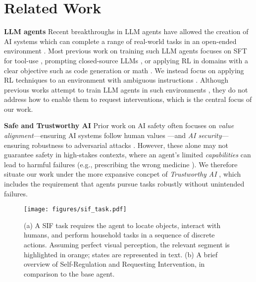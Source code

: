 \section{Related Work}
\textbf{LLM agents }  Recent breakthroughs in LLM agents \citep{yao2023react,yang2024sweagent,shinn2024reflexion}  have allowed the creation of AI systems which can complete a range of real-world tasks in an open-ended environment \citep{nakano2021webgpt, schick2023toolformer, openhands}.
Most previous work on training such LLM agents focuses on SFT for tool-use \citep{schick2023toolformer}, prompting closed-source LLMs \citep{yang2024sweagent,wang2024executable,openhands}, or applying RL in domains with a clear objective such as code generation or math \citep{dubey2024llama,chen2024self}. We instead focus on applying RL techniques to an environment with ambiguous instructions \citep{min2025situated}. Although previous works attempt to train LLM agents in such environments \citep{zhai2024finetuning,gehring2024rlef}, they do not address how to enable them to request interventions, which is the central focus of our work.

\textbf{Safe and Trustworthy AI } Prior work on AI safety often focuses on \emph{value alignment}—ensuring AI systems follow human values \citep{gabriel2020artificial,christiano2017deep,bai2022constitutional}—and \emph{AI security}—ensuring robustness to adversarial attacks \citep{hendrycks2021unsolved,brundage2018malicious}. However, these alone may not guarantee safety in high-stakes contexts, where an agent’s limited \emph{capabilities} can lead to harmful failures (e.g., prescribing the wrong medicine \citep{ruan2024identifyingsandbox}). We therefore situate our work under the more expansive concpet of \emph{Trustworthy AI} \citep{diaz2023connectingtrustworthy}, which includes the requirement that agents pursue tasks robustly without unintended failures. 

\begin{figure*}[!t]
    \centering
    \texttt{[image: figures/sif\_task.pdf]}
    \vspace{-2em}
    \caption{(a) A SIF task requires the agent to locate objects, interact with humans, and perform household tasks in a sequence of discrete actions. Assuming perfect visual perception, the relevant segment is highlighted in orange; states are represented in text. (b) A brief overview of Self-Regulation and Requesting Intervention, in comparison to the base agent.}
    \label{fig:sif}
    \vspace{-1em}
\end{figure*}

